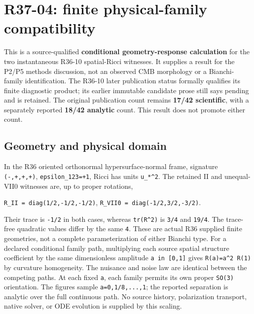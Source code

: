 \documentclass[
]{article}
\author{}
\date{}
\begin{document}
\hypertarget{r37-04-finite-physical-family-compatibility}{%
\section{R37-04: finite physical-family
compatibility}\label{r37-04-finite-physical-family-compatibility}}

This is a source-qualified \textbf{conditional geometry-response
calculation} for the two instantaneous R36-10 spatial-Ricci witnesses.
It supplies a result for the P2/P5 methods discussion, not an observed
CMB morphology or a Bianchi-family identification. The R36-10 later
publication status formally qualifies its finite diagnostic product; its
earlier immutable candidate prose still says pending and is retained.
The original publication count remains \textbf{17/42 scientific}, with a
separately reported \textbf{18/42 analytic} count. This result does not
promote either count.

\hypertarget{geometry-and-physical-domain}{%
\subsection{Geometry and physical
domain}\label{geometry-and-physical-domain}}

In the R36 oriented orthonormal hypersurface-normal frame, signature
\texttt{(-,+,+,+)}, \texttt{epsilon\_123=+1}, Ricci has units
\texttt{u\_*\^{}2}. The retained II and unequal-VII0 witnesses are, up
to proper rotations,

\texttt{R\_II\ =\ diag(1/2,-1/2,-1/2)},
\texttt{R\_VII0\ =\ diag(-1/2,3/2,-3/2)}.

Their trace is \texttt{-1/2} in both cases, whereas \texttt{tr(R\^{}2)}
is \texttt{3/4} and \texttt{19/4}. The trace-free quadratic values
differ by the same \texttt{4}. These are actual R36 supplied finite
geometries, not a complete parameterization of either Bianchi type. For
a declared conditional family path, multiplying each source spatial
structure coefficient by the same dimensionless amplitude
\texttt{a\ in\ {[}0,1{]}} gives \texttt{R(a)=a\^{}2\ R(1)} by curvature
homogeneity. The nuisance and noise law are identical between the
competing paths. At each fixed \texttt{a}, each family permits its own
proper \texttt{SO(3)} orientation. The figures sample
\texttt{a=0,1/8,...,1}; the reported separation is analytic over the
full continuous path. No source history, polarization transport, native
solver, or ODE evolution is supplied by this scaling.
\end{document}
